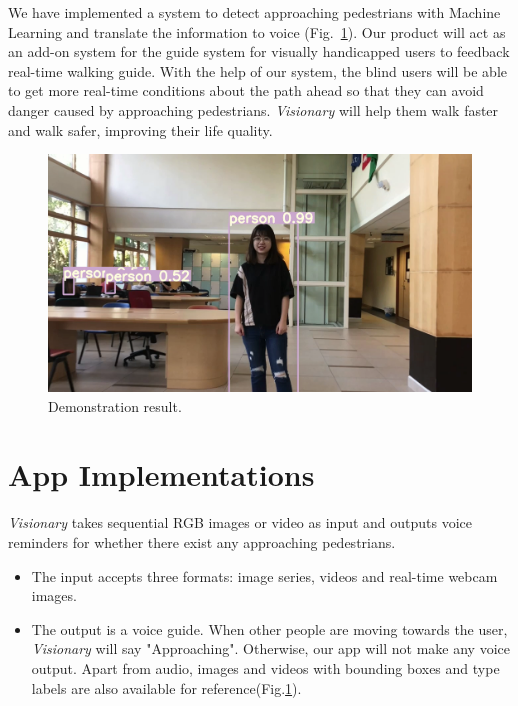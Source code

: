 \documentclass[letterpaper]{article} %
\begin{document}
\noindent We have implemented a system to detect approaching pedestrians with Machine Learning and translate the information to voice (Fig.~\ref{fig:demo}). Our product will act as an add-on system for the guide system for visually handicapped users to feedback real-time walking guide. With the help of our system, the blind users will be able to get more real-time conditions about the path ahead so that they can avoid danger caused by approaching pedestrians. \textit{Visionary} will help them walk faster and walk safer, improving their life quality.
\begin{figure}[ht]
\hspace{0mm}
\centering
\includegraphics[width=0.85\linewidth,height = 0.5\linewidth]{Figure/demo1.png}
\caption{\footnotesize{Demonstration result.}}
\label{fig:demo}
\vspace{0mm}
\end{figure}


\section{App Implementations}
\textit{Visionary} takes sequential RGB images or video as input and outputs voice reminders for whether there exist any approaching pedestrians.
\begin{itemize}
\item The input accepts three formats: image series, videos and real-time webcam images.
\item The output is a voice guide. When other people are moving towards the user, \textit{Visionary} will say "Approaching". Otherwise, our app will not make any voice output. Apart from audio, images and videos with bounding boxes and type labels are also available for reference(Fig.\ref{fig:demo}). 
\end{itemize}
\end{document}
